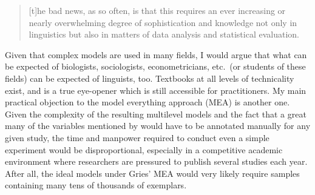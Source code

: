 \begin{quote}
  [t]he bad news, as so often, is that this requires an ever increasing or nearly overwhelming degree of sophistication and knowledge not only in linguistics but also in matters of data analysis and statistical evaluation.
\end{quote}

Given that complex models are used in many fields, I would argue that what can be expected of biologists, sociologists, econometricians, etc.\ (or students of these fields) can be expected of linguists, too.
Textbooks at all levels of technicality exist, and \citet{GelmanHill2006} is a true eye-opener which is still accessible for practitioners.
My main practical objection to the model everything approach (MEA) is another one.
Given the complexity of the resulting multilevel models and the fact that a great many of the variables mentioned by \citet{Gries2017a} would have to be annotated manually for any given study, the time and manpower required to conduct even a simple experiment would be disproportional, especially in a competitive academic environment where researchers are pressured to publish several studies each year.
After all, the ideal models under Gries' MEA would very likely require samples containing many tens of thousands of exemplars.

